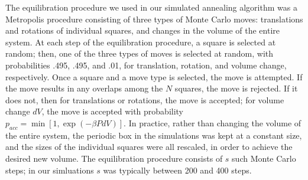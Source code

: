 \documentclass[preprint,aps]{revtex4}
\begin{document}

The equilibration procedure we used in our simulated annealing algorithm was a Metropolis procedure consisting of three types of Monte Carlo moves:  translations and rotations of individual squares, and changes in the volume of the entire system.  At each step of the equilibration procedure, a square is selected at random; then, one of the three types of moves is selected at random, with probabilities .495, .495, and .01, for translation, rotation, and volume change, respectively.  Once a square and a move type is selected, the move is attempted.  If the move results in any overlaps among the $N$ squares, the move is rejected.  If it does not, then for translations or rotations, the move is accepted; for volume change $dV$, the move is accepted with probability $p_{acc}=\min[1,\exp(-\beta P dV)]$.  In practice, rather than changing the volume of the entire system, the periodic box in the simulations was kept at a constant size, and the sizes of the individual squares were all rescaled, in order to achieve the desired new volume. The equilibration procedure consists of $s$ such Monte Carlo steps; in our simluations $s$ was typically between 200 and 400 steps.  
\end{document}
